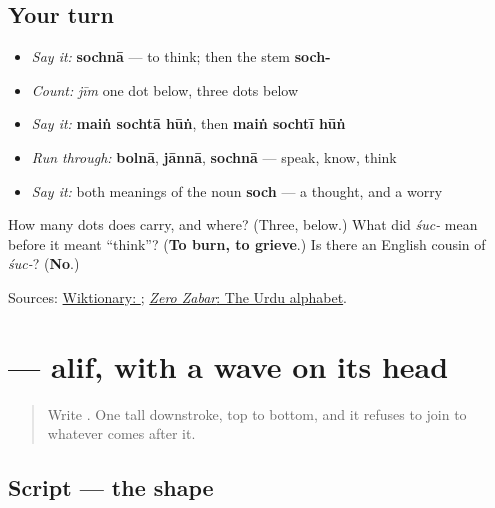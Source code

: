 \subsection*{Your turn}
\begin{itemize}
\raggedright
  \item \emph{Say it:} \textbf{sochnā} — to think; then the stem \textbf{soch-}
  \item \emph{Count:} \emph{jīm} one dot below, \textbf{} three dots below
  \item \emph{Say it:} \textbf{maiṅ sochtā hūṅ}, then \textbf{maiṅ sochtī hūṅ}
  \item \emph{Run through:} \textbf{bolnā}, \textbf{jānnā}, \textbf{sochnā} — speak, know, think
  \item \emph{Say it:} both meanings of the noun \textbf{soch} — a thought, and a worry
\end{itemize}

\begin{tcolorbox}[breakable,colback=teal!4,colframe=teal!35!black,title={Before you move on}]
How many dots does \textbf{} carry, and where? (Three, below.) What did \emph{śuc-} mean before it meant “think”? (\textbf{To burn, to grieve}.) Is there an English cousin of \emph{śuc-}? (\textbf{No}.)

Sources: \href{https://en.wiktionary.org/wiki/\%D8\%B3\%D9\%88\%DA\%86\%D9\%86\%D8\%A7}{Wiktionary: }; \href{https://openbooks.library.northwestern.edu/zerozabar/chapter/the-urdu-alphabet/}{\emph{Zero Zabar}: The Urdu alphabet}.
\end{tcolorbox}
\section[\texorpdfstring{\ur{آ} (alif madda)}{آ (alif madda)}]{ — alif, with a wave on its head}

\label{lesson:UR-W07-alif-madda}



\begin{quote}
Write . One tall downstroke, top to bottom, and it refuses to join to whatever comes after it.
\end{quote}

\subsection*{Script — the shape}
\begin{quote}
\end{quote}

